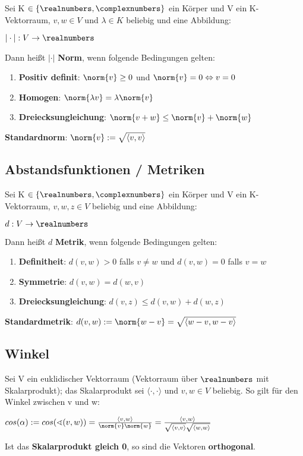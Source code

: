 Sei K $\in \{\realnumbers,\complexnumbers\}$ ein Körper und V ein K-Vektorraum, $v, w \in V$ und $\lambda \in K$ beliebig und eine Abbildung:
\begin{center}
	$|\cdot|: V \rightarrow \realnumbers$
\end{center}
Dann heißt $|\cdot|$ \textbf{Norm}, wenn folgende Bedingungen gelten:
\begin{enumerate}
	\item \textbf{Positiv definit}: $\norm{v} \geq 0$ und $\norm{v} = 0 \Leftrightarrow v = 0$
	\item \textbf{Homogen}: $\norm{\lambda v} = \lambda \norm{v}$
	\item \textbf{Dreiecksungleichung}: $\norm{v + w} \leq \norm{v} + \norm{w}$
\end{enumerate}
\textbf{Standardnorm}: $\norm{v} := \sqrt{\langle v, v\rangle}$

\subsection{Abstandsfunktionen / Metriken}%
\label{sp:sub:abstandsfunktionen_metriken}

Sei K $\in \{\realnumbers,\complexnumbers\}$ ein Körper und V ein K-Vektorraum, $v, w, z \in V$ beliebig und eine Abbildung:
\begin{center}
	$d: V \rightarrow \realnumbers$
\end{center}
Dann heißt $d$ \textbf{Metrik}, wenn folgende Bedingungen gelten:
\begin{enumerate}
	\item \textbf{Definitheit}: $d(v, w) > 0$ falls $v \neq w$ und $d(v, w) = 0$ falls $v = w$
	\item \textbf{Symmetrie}: $d(v, w) = d(w, v)$
	\item \textbf{Dreiecksungleichung}: $d(v, z) \leq d(v, w) + d(w, z)$
\end{enumerate}
\textbf{Standardmetrik}: $d(v, w) := \norm{w - v} = \sqrt{\langle w - v, w - v\rangle}$
	
\subsection{Winkel}%
\label{sp:sub:winkel}

Sei V ein euklidischer Vektorraum (Vektorraum über $\realnumbers$ mit Skalarprodukt); das Skalarprodukt sei $\langle \cdot, \cdot\rangle$ und $v, w\in V$ beliebig. So gilt für den Winkel zwischen v und w:
\begin{center}
	$cos(\alpha) := cos(\sphericalangle(v, w)) = \frac{\langle v, w\rangle}{\norm{v}\norm{w}} = \frac{\langle v, w\rangle}{\sqrt{\langle v, v \rangle}\sqrt{\langle w, w\rangle}}$
\end{center}
Ist das \textbf{Skalarprodukt gleich 0}, so sind die Vektoren \textbf{orthogonal}.

